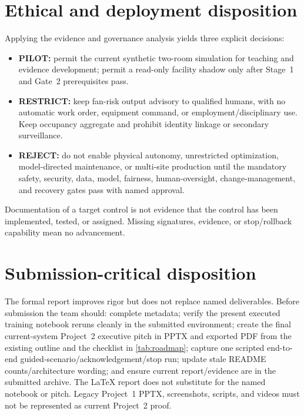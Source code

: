 \section{Ethical and deployment disposition}
Applying the evidence and governance analysis yields three explicit decisions:
\begin{itemize}
\item \textbf{PILOT:} permit the current synthetic two-room simulation for teaching and evidence development; permit a read-only facility shadow only after Stage~1 and Gate~2 prerequisites pass.
\item \textbf{RESTRICT:} keep fan-risk output advisory to qualified humans, with no automatic work order, equipment command, or employment/disciplinary use. Keep occupancy aggregate and prohibit identity linkage or secondary surveillance.
\item \textbf{REJECT:} do not enable physical autonomy, unrestricted optimization, model-directed maintenance, or multi-site production until the mandatory safety, security, data, model, fairness, human-oversight, change-management, and recovery gates pass with named approval.
\end{itemize}
Documentation of a target control is not evidence that the control has been implemented, tested, or assigned. Missing signatures, evidence, or stop/rollback capability mean no advancement.

\section{Submission-critical disposition}
The formal report improves rigor but does not replace named deliverables. Before submission the team should: complete metadata; verify the present executed training notebook reruns cleanly in the submitted environment; create the final current-system Project~2 executive pitch in PPTX and exported PDF from the existing outline and the checklist in \cref{tab:roadmap}; capture one scripted end-to-end guided-scenario/acknowledgement/stop run; update stale README counts/architecture wording; and ensure current report/evidence are in the submitted archive. The LaTeX report does not substitute for the named notebook or pitch. Legacy Project~1 PPTX, screenshots, scripts, and videos must not be represented as current Project~2 proof.

